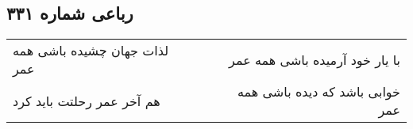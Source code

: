 \begin{center}
\section*{رباعی شماره ۳۳۱}
\label{sec:sh331}
\begin{longtable}{l p{0.5cm} r}
لذات جهان چشیده باشی همه عمر
&&
با یار خود آرمیده باشی همه عمر
\\
هم آخر عمر رحلتت باید کرد
&&
خوابی باشد که دیده باشی همه عمر
\\
\end{longtable}
\end{center}
